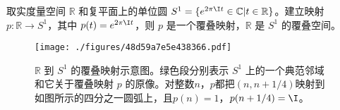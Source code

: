 \begin{example}{}
取实度量空间 $\mathbb{R}$ 和复平面上的单位圆 $S^1=\{e^{2\pi\I t}\in\mathbb{C}|t\in\mathbb{R}\}$。建立映射 $p:\mathbb{R}\rightarrow S^1$，其中 $p(t)=e^{2\pi\I t}$，则 $p$ 是一个覆叠映射，$\mathbb{R}$ 是 $S^1$ 的覆叠空间。

\begin{figure}[ht]
\centering
\texttt{[image: ./figures/48d59a7e5e438366.pdf]}
\caption{$\mathbb{R}$ 到 $S^1$ 的覆叠映射示意图。绿色段分别表示 $S^1$ 上的一个典范邻域和它关于覆叠映射 $p$ 的原像。对整数$n$，$p$都把$(n, n+1/4)$映射到如图所示的四分之一圆弧上，且$p(n)=1$，$p(n+1/4)=\I$。} \label{fig_CovTop_1}
\end{figure}
\end{example}

